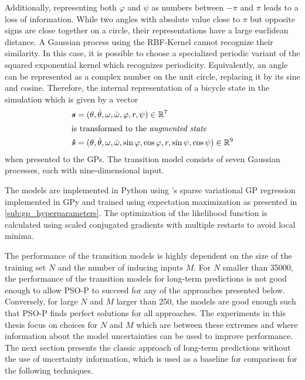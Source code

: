 Additionally, representing both $\varphi$ and $\psi$ as numbers between $-\pi$ and $\pi$ leads to a loss of information.
While two angles with absolute value close to $\pi$ but opposite signs are close together on a circle, their representations have a large euclidean distance.
A Gaussian process using the RBF-Kernel cannot recognize their similarity.
In this case, it is possible to choose a specialized periodic variant of the squared exponential kernel which recognizes periodicity.
Equivalently, an angle can be represented as a complex number on the unit circle, replacing it by its sine and cosine.
Therefore, the internal representation of a bicycle state in the simulation which is given by a vector
\begin{align}
    \bm{s} &= (\theta, \dot{\theta}, \omega, \dot{\omega}, \varphi, r, \psi) \in \mathbb{R}^7 \\
    \intertext{is transformed to the \emph{augmented state}}
    \bm{\hat{s}} &= (\theta, \dot{\theta}, \omega, \dot{\omega}, \sin\varphi, \cos\varphi, r, \sin\psi, \cos\psi) \in \mathbb{R}^9 \label{eq:augmented_state}
\end{align}
when presented to the GPs.
The transition model consists of seven Gaussian processes, each with nine-dimensional input.

The models are implemented in Python using \citeauthor{titsias_variational_2009}'s sparse variational GP regression implemented in GPy \cite{gpy_gpy:_2012} and trained using expectation maximization as presented in \cref{sub:gp_hyperparameters}.
The optimization of the likelihood function is calculated using scaled conjugated gradients with multiple restarts to avoid local minima.

The performance of the transition models is highly dependent on the size of the training set $N$ and the number of inducing inputs $M$.
For $N$ smaller than 35000, the performance of the transition models for long-term predictions is not good enough to allow PSO-P to succeed for any of the approaches presented below.
Conversely, for large $N$ and $M$ larger than 250, the models are good enough such that PSO-P finds perfect solutions for all approaches.
The experiments in this thesis focus on choices for $N$ and $M$ which are between these extremes and where information about the model uncertainties can be used to improve performance.
The next section presents the classic approach of long-term predictions without the use of uncertainty information, which is used as a baseline for comparison for the following techniques.


